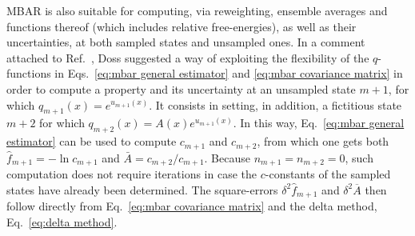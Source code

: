 \documentclass[aip,jcp,reprint,amsmath,amssymb]{revtex4-1}
\begin{document}
MBAR is also suitable for computing, via reweighting, ensemble averages and functions thereof (which includes relative free-energies), as well as their uncertainties, at both sampled states and unsampled ones. In a comment attached to Ref.~, Doss suggested a way of exploiting the flexibility of the $q$-functions in Eqs.~\eqref{eq:mbar general estimator} and \eqref{eq:mbar covariance matrix} in order to compute a property and its uncertainty at an unsampled state $m+1$, for which $q_{m+1}(x) = e^{u_{m+1}(x)}$. It consists in setting, in addition, a fictitious state $m+2$ for which $q_{m+2}(x) = A(x)e^{u_{m+1}(x)}$. In this way, Eq.~\eqref{eq:mbar general estimator} can be used to compute $c_{m+1}$ and $c_{m+2}$, from which one gets both $\hat f_{m+1} = -\ln c_{m+1}$ and $\bar A = {c_{m+2}}/{c_{m+1}}$. Because $n_{m+1} = n_{m+2} = 0$, such computation does not require iterations in case the $c$-constants of the sampled states have already been determined. The square-errors $\delta^2 \hat f_{m+1}$ and $\delta^2 \overline A$ then follow directly from Eq.~\eqref{eq:mbar covariance matrix} and the delta method, Eq.~\eqref{eq:delta method}.


\end{document}
